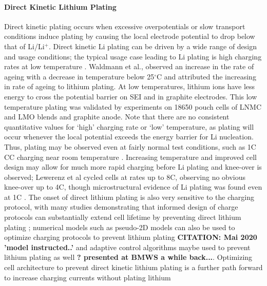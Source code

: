 \documentclass{article}
\begin{document}
\paragraph{Direct Kinetic Lithium Plating}
Direct kinetic plating occurs when excessive overpotentials or slow transport conditions induce plating by causing the local electrode potential to drop below that of Li/Li$\mathrm{^+}$. Direct kinetic Li plating can be driven by a wide range of design and usage conditions; the typical usage case leading to Li plating is high charging rates at low temperature \cite{waldmann_temperature_2014, petzl_lithium_2015}. Waldmann et al.,\cite{waldmann_temperature_2014} observed an increase in the rate of ageing with a decrease in temperature below 25$^{\circ}$C and attributed the increasing in rate of ageing to lithium plating. At low temperatures, lithium ions have less energy to cross the potential barrier on SEI and in graphite electrodes. This low temperature plating was validated by experiments on 18650 pouch cells of LNMC and LMO blends and graphite anode. Note that there are no consistent quantitative values for ‘high’ charging rate or ‘low’ temperature, as plating will occur whenever the local potential exceeds the energy barrier for Li nucleation. Thus, plating may be observed even at fairly normal test conditions, such as 1C CC charging near room temperature \cite{waldmann_optimization_2015,burns_-situ_2015}. Increasing temperature and improved cell design may allow for much more rapid charging before Li plating and knee-over is observed; Lewerenz et al cycled cells at rates up to 8C, observing no obvious knee-over up to 4C, though microstructural evidence of Li plating was found even at 1C \cite{lewerenz_systematic_2017}. The onset of direct lithium plating is also very sensitive to the charging protocol, with many studies demonstrating that informed design of charge protocols can substantially extend cell lifetime by preventing direct lithium plating \cite{waldmann_optimization_2015,schindler_fast_2018}; numerical models such as pseudo-2D models can also be used to optimize charging protocols to prevent lithium plating \textbf{CITATION: Mai 2020 'model instructed..'} and adaptive control algorithms maybe used to prevent lithium plating as well \textbf{? presented at BMWS a while back...}. Optimizing cell architecture to prevent direct kinetic lithium plating is a further path forward to increase charging currents without plating lithium \cite{usseglio-viretta_enabling_2020}
\end{document}
